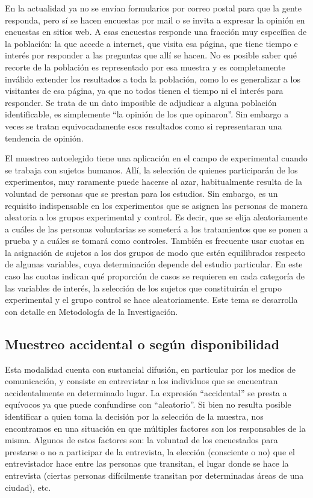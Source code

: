 \documentclass[]{book}
\begin{document}
En la actualidad ya no se envían formularios por correo postal para que
la gente responda, pero sí se hacen encuestas por mail o se invita a
expresar la opinión en encuestas en sitios web. A esas encuestas
responde una fracción muy específica de la población: la que accede a
internet, que visita esa página, que tiene tiempo e interés por
responder a las preguntas que allí se hacen. No es posible saber qué
recorte de la población es representado por esa muestra y es
completamente inválido extender los resultados a toda la población, como
lo es generalizar a los visitantes de esa página, ya que no todos tienen
el tiempo ni el interés para responder. Se trata de un dato imposible de
adjudicar a alguna población identificable, es simplemente ``la opinión
de los que opinaron''. Sin embargo a veces se tratan equivocadamente esos
resultados como si representaran una tendencia de opinión.

El muestreo autoelegido tiene una aplicación en el campo de experimental
cuando se trabaja con sujetos humanos. Allí, la selección de quienes
participarán de los experimentos, muy raramente puede hacerse al azar,
habitualmente resulta de la voluntad de personas que se prestan para los
estudios. Sin embargo, es un requisito indispensable en los experimentos
que se asignen las personas de manera aleatoria a los grupos
experimental y control. Es decir, que se elija aleatoriamente a cuáles
de las personas voluntarias se someterá a los tratamientos que se ponen
a prueba y a cuáles se tomará como controles. También es frecuente usar
cuotas en la asignación de sujetos a los dos grupos de modo que estén
equilibrados respecto de algunas variables, cuya determinación depende
del estudio particular. En este caso las cuotas indican qué proporción
de casos se requieren en cada categoría de las variables de interés, la
selección de los sujetos que constituirán el grupo experimental y el
grupo control se hace aleatoriamente. Este tema se desarrolla con
detalle en Metodología de la Investigación.

\hypertarget{muestreo-accidental-o-seguxfan-disponibilidad}{%
\subsection{Muestreo accidental o según disponibilidad}\label{muestreo-accidental-o-seguxfan-disponibilidad}}

Esta modalidad cuenta con sustancial difusión, en particular por los
medios de comunicación, y consiste en entrevistar a los individuos que
se encuentran accidentalmente en determinado lugar. La expresión
``accidental'' se presta a equívocos ya que puede confundirse con
``aleatorio''. Si bien no resulta posible identificar a quien toma la
decisión por la selección de la muestra, nos encontramos en una
situación en que múltiples factores son los responsables de la misma.
Algunos de estos factores son: la voluntad de los encuestados para
prestarse o no a participar de la entrevista, la elección (consciente o
no) que el entrevistador hace entre las personas que transitan, el lugar
donde se hace la entrevista (ciertas personas difícilmente transitan por
determinadas áreas de una ciudad), etc.
\end{document}

